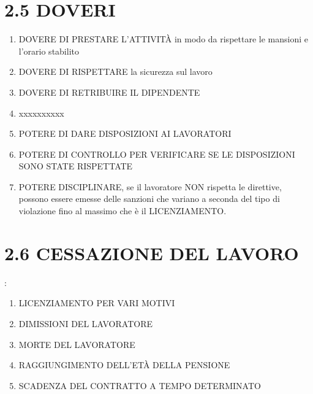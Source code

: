 \documentclass[letterpaper,10pt,italian]{sphinxmanual}
\begin{document}
\section{2.5 \sphinxhyphen{} DOVERI}
\label{\detokenize{2.DIRITTI ECONOMICI-LAVORO:doveri}}\begin{enumerate}
%
\item {} 
\sphinxAtStartPar
DOVERE DI PRESTARE L’ATTIVITÀ in modo da rispettare le mansioni e l’orario stabilito

\item {} 
\sphinxAtStartPar
DOVERE DI RISPETTARE la sicurezza sul lavoro

\item {} 
\sphinxAtStartPar
DOVERE DI RETRIBUIRE IL DIPENDENTE

\item {} 
\sphinxAtStartPar
xxxxxxxxxx

\item {} 
\sphinxAtStartPar
POTERE DI DARE DISPOSIZIONI AI LAVORATORI

\item {} 
\sphinxAtStartPar
POTERE DI CONTROLLO PER VERIFICARE SE LE DISPOSIZIONI SONO STATE RISPETTATE

\item {} 
\sphinxAtStartPar
POTERE DISCIPLINARE, se il lavoratore NON rispetta le direttive, possono essere emesse delle sanzioni che variano a seconda del tipo di violazione fino al massimo che è il LICENZIAMENTO.

\end{enumerate}


\section{2.6 \sphinxhyphen{} CESSAZIONE DEL LAVORO}
\label{\detokenize{2.DIRITTI ECONOMICI-LAVORO:cessazione-del-lavoro}}
\sphinxAtStartPar
{}:
\begin{enumerate}
%
\item {} 
\sphinxAtStartPar
LICENZIAMENTO PER VARI MOTIVI

\item {} 
\sphinxAtStartPar
DIMISSIONI DEL LAVORATORE

\item {} 
\sphinxAtStartPar
MORTE DEL LAVORATORE

\item {} 
\sphinxAtStartPar
RAGGIUNGIMENTO DELL’ETÀ DELLA PENSIONE

\item {} 
\sphinxAtStartPar
SCADENZA DEL CONTRATTO A TEMPO DETERMINATO

\end{enumerate}
\end{document}
